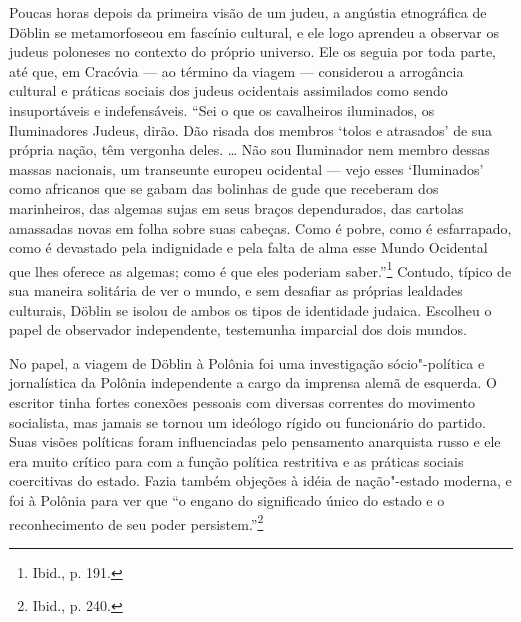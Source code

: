 Poucas horas depois da primeira visão de um judeu, a angústia
etnográfica de Döblin se metamorfoseou em fascínio cultural, e ele logo
aprendeu a observar os judeus poloneses no contexto do próprio universo.
Ele os seguia por toda parte, até que, em Cracóvia --- ao término da
viagem --- considerou a arrogância cultural e práticas sociais dos judeus
ocidentais assimilados como sendo insuportáveis e indefensáveis. ``Sei o
que os cavalheiros iluminados, os Iluminadores Judeus, dirão. Dão risada
dos membros `tolos e atrasados' de sua própria nação, têm vergonha
deles. \ldots{} Não sou Iluminador nem membro dessas massas nacionais,
um transeunte europeu ocidental --- vejo esses `Iluminados' como africanos
que se gabam das bolinhas de gude que receberam dos marinheiros, das
algemas sujas em seus braços dependurados, das cartolas amassadas novas
em folha sobre suas cabeças. Como é pobre, como é esfarrapado, como é
devastado pela indignidade e pela falta de alma esse Mundo Ocidental que
lhes oferece as algemas; como é que eles poderiam saber.''\footnote{Ibid.,
  p. 191.} Contudo, típico de sua maneira solitária de ver o mundo, e
sem desafiar as próprias lealdades culturais, Döblin se isolou de ambos
os tipos de identidade judaica. Escolheu o papel de observador
independente, testemunha imparcial dos dois mundos.

\asterisc

No papel, a viagem de Döblin à Polônia foi uma investigação
sócio"-política e jornalística da Polônia independente a cargo da
imprensa alemã de esquerda. O escritor tinha fortes conexões pessoais
com diversas correntes do movimento socialista, mas jamais se tornou um
ideólogo rígido ou funcionário do partido. Suas visões políticas foram
influenciadas pelo pensamento anarquista russo e ele era muito crítico
para com a função política restritiva e as práticas sociais coercitivas
do estado. Fazia também objeções à idéia de nação"-estado moderna, e foi
à Polônia para ver que ``o engano do significado único do estado e o
reconhecimento de seu poder persistem.''\footnote{Ibid., p. 240.}

